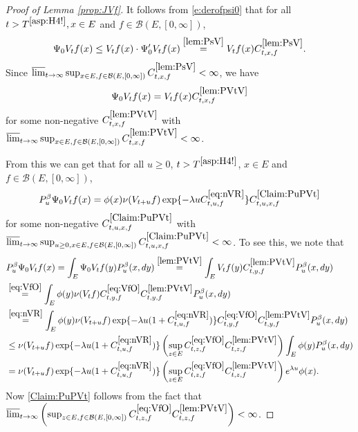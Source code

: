\documentclass[12pt,a4paper]{amsart}
\numberwithin{equation}{section}
\theoremstyle{plain}
\theoremstyle{definition}
\theoremstyle{remark}
\begin{document}
\begin{proof}[Proof of Lemma \ref{prop:JVf}]
	It follows from \eqref{e:derofpsi0} that for all $t> T^{\eqref{asp:H4!}}, x\in E$ and $f\in \mathcal B(E,[0,\infty])$,
\begin{equation}
	\Psi_0 V_t f (x)
	\leq V_tf(x)\cdot \Psi_0' V_t f(x) \overset{\eqref{lem:PsV}}= V_tf(x) C^{\eqref{lem:PsV}}_{t,x,f}.
\end{equation}
	Since $\varlimsup_{t\to \infty} \sup_{x\in E, f\in \mathcal B(E,[0,\infty])} C^{\eqref{lem:PsV}}_{t,x,f} <\infty$, we have
\begin{equation} \label{lem:PVtV}
	\Psi_0 V_t f(x) = V_tf(x) C^{\eqref{lem:PVtV}}_{t,x,f}
\end{equation}
	for some non-negative $C^{\eqref{lem:PVtV}}_{t,x,f}$ with $\varlimsup_{t\to \infty} \sup_{x\in E, f\in \mathcal B(E,[0,\infty])}
	C^{\eqref{lem:PVtV}}_{t,x,f} < \infty$.
	
	From this we can get that for all $u\geq 0$, $t>T^{\eqref{asp:H4!}}$, $x\in E$ and $f\in \mathcal B(E,[0,\infty])$,
\begin{equation} \label{Claim:PuPVt}
	P_u^\beta \Psi_0 V_{t} f(x) = \phi(x)\nu(V_{t+u}f) \exp\{-\lambda u C^{\eqref{eq:nVR}}_{t,u,f} \} C^{\eqref{Claim:PuPVt}}_{t,u,x,f}
\end{equation}
	for some non-negative $C^{\eqref{Claim:PuPVt}}_{t,u,x,f}$ with
	$\varlimsup_{t\to \infty}
	\sup_{u\geq 0, x\in E, f\in \mathcal B(E,[0,\infty])}
	C^{\eqref{Claim:PuPVt}}_{t,u,x,f} < \infty$.
	To see this, we note that
	\begin{align}
	&P_u^\beta \Psi_0 V_{t} f(x)
	= \int_{E} \Psi_0V_tf(y) P_u^\beta (x,dy)
	\overset{\eqref{lem:PVtV}}=\int_{E} V_tf(y)C^{\eqref{lem:PVtV}}_{t,y,f} P_u^\beta (x,dy)
	\\&\overset{\eqref{eq:VfO}}=\int_{E} \phi(y)\nu(V_tf)C^{\eqref{eq:VfO}}_{t,y,f}C^{\eqref{lem:PVtV}}_{t,y,f} P_u^\beta (x,dy)
	\\&\overset{\eqref{eq:nVR}}=\int_{E} \phi(y)\nu(V_{t+u}f) \exp\{-\lambda u (1+C^{\eqref{eq:nVR}}_{t,u,f}) \} C^{\eqref{eq:VfO}}_{t,y,f}C^{\eqref{lem:PVtV}}_{t,y,f} P_u^\beta (x,dy)
	\\& \leq \nu(V_{t+u}f) \exp\{-\lambda u (1+C^{\eqref{eq:nVR}}_{t,u,f}) \} \left(\sup_{z\in E} C^{\eqref{eq:VfO}}_{t,z,f}C^{\eqref{lem:PVtV}}_{t,z,f}\right) \int_{E} \phi(y) P_u^\beta (x,dy)
	\\& = \nu(V_{t+u}f) \exp\{-\lambda u (1+C^{\eqref{eq:nVR}}_{t,u,f}) \} \left(\sup_{z\in E} C^{\eqref{eq:VfO}}_{t,z,f}C^{\eqref{lem:PVtV}}_{t,z,f}\right) e^{\lambda u}\phi(x).
	\end{align}
    Now \eqref{Claim:PuPVt} follows from the fact that
	$\varlimsup_{t\to \infty} \left(
	\sup_{z\in E, f\in \mathcal B(E,[0,\infty])} C^{\eqref{eq:VfO}}_{t,z,f}
	C^{\eqref{lem:PVtV}}_{t,z,f}\right) < \infty$.
	

\end{proof}
\end{document}

